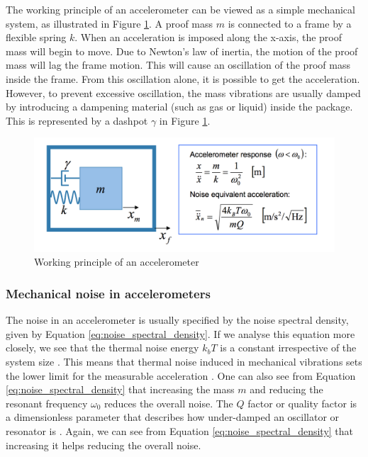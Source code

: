 The working principle of an accelerometer can be viewed as a simple mechanical system, as illustrated in Figure \ref{fig:accel_working_principle}. A proof mass $m$ is connected to a frame by a flexible spring $k$. When an acceleration is imposed along the x-axis, the proof mass will begin to move. Due to Newton's law of inertia, the motion of the proof mass will lag the frame motion. This will cause an oscillation of the proof mass inside the frame. From this oscillation alone, it is possible to get the acceleration. However, to prevent excessive oscillation, the mass vibrations are usually damped by introducing a dampening material (such as gas or liquid) inside the package. This is represented by a dashpot $\gamma$ in Figure \ref{fig:accel_working_principle}.

\begin{figure}[h]
\centering
\includegraphics[scale=0.5]{fig/accelerometer_working_principle.png}
\caption{Working principle of an accelerometer \cite[~p.34]{kaajakari09}}
\label{fig:accel_working_principle}
\end{figure}

\subsubsection{Mechanical noise in accelerometers}

The noise in an accelerometer is usually specified by the noise spectral density, given by Equation \ref{eq:noise_spectral_density}. If we analyse this equation more closely, we see that the thermal noise energy $k_b T$ is a constant irrespective of the system size \cite[~p.13]{kaajakari09}. This means that thermal noise induced in mechanical vibrations sets the lower limit for the measurable acceleration \cite[~p.41]{kaajakari09}. One can also see from Equation \ref{eq:noise_spectral_density} that increasing the mass $m$ and reducing the resonant frequency $\omega_0$ reduces the overall noise. The $Q$ factor or quality factor is a dimensionless parameter that describes how under-damped an oscillator or resonator is \cite{resonance}. Again, we can see from Equation \ref{eq:noise_spectral_density} that increasing it helps reducing the overall noise.

